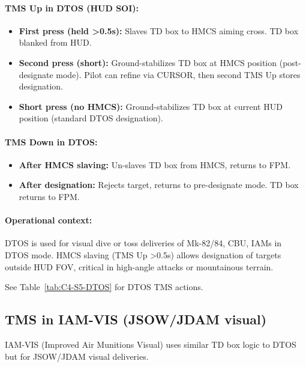 \documentclass[11pt, a4paper, twoside]{report}
\begin{document}
\paragraph{TMS Up in DTOS (HUD SOI):}
\begin{itemize}
    \item \textbf{First press (held >0.5s):} Slaves TD box to HMCS aiming cross. TD box blanked from HUD.
    \item \textbf{Second press (short):} Ground-stabilizes TD box at HMCS position (post-designate mode). Pilot can refine via CURSOR, then second TMS Up stores designation.
    \item \textbf{Short press (no HMCS):} Ground-stabilizes TD box at current HUD position (standard DTOS designation).
\end{itemize}

\paragraph{TMS Down in DTOS:}
\begin{itemize}
    \item \textbf{After HMCS slaving:} Un-slaves TD box from HMCS, returns to FPM.
    \item \textbf{After designation:} Rejects target, returns to pre-designate mode. TD box returns to FPM.
\end{itemize}

\paragraph{Operational context:}
DTOS is used for visual dive or toss deliveries of Mk-82/84, CBU, IAMs in DTOS mode. HMCS slaving (TMS Up >0.5s) allows designation of targets outside HUD FOV, critical in high-angle attacks or mountainous terrain.

See Table~\ref{tab:C4-S5-DTOS} for DTOS TMS actions.

\subsection{TMS in IAM-VIS (JSOW/JDAM visual)}
\label{sec:C4-S5-S3}

IAM-VIS (Improved Air Munitions Visual) uses similar TD box logic to DTOS but for JSOW/JDAM visual deliveries.
\end{document}
